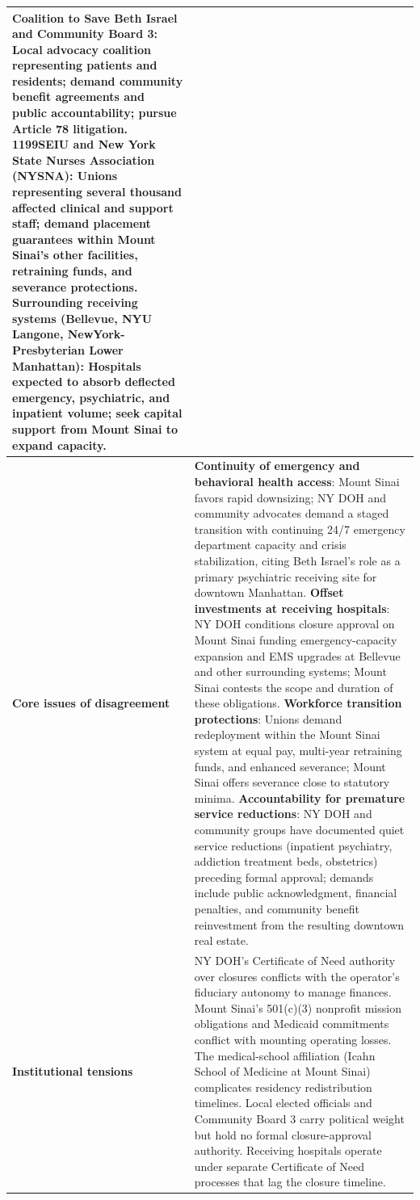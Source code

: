 \documentclass{llmxive}
\begin{document}
\begin{table}[p]
\begin{tabularx}{\textwidth}{@{}l X@{}}
\newline
\textbf{Coalition to Save Beth Israel and Community Board 3}: Local advocacy coalition representing patients and residents; demand community benefit agreements and public accountability; pursue Article 78 litigation.
\newline
\textbf{1199SEIU and New York State Nurses Association (NYSNA)}: Unions representing several thousand affected clinical and support staff; demand placement guarantees within Mount Sinai's other facilities, retraining funds, and severance protections.
\newline
\textbf{Surrounding receiving systems (Bellevue, NYU Langone, NewYork-Presbyterian Lower Manhattan)}: Hospitals expected to absorb deflected emergency, psychiatric, and inpatient volume; seek capital support from Mount Sinai to expand capacity. \\
\midrule
\textbf{Core issues of disagreement} &
\textbf{Continuity of emergency and behavioral health access}: Mount Sinai favors rapid downsizing; NY DOH and community advocates demand a staged transition with continuing 24/7 emergency department capacity and crisis stabilization, citing Beth Israel's role as a primary psychiatric receiving site for downtown Manhattan.
\newline
\textbf{Offset investments at receiving hospitals}: NY DOH conditions closure approval on Mount Sinai funding emergency-capacity expansion and EMS upgrades at Bellevue and other surrounding systems; Mount Sinai contests the scope and duration of these obligations.
\newline
\textbf{Workforce transition protections}: Unions demand redeployment within the Mount Sinai system at equal pay, multi-year retraining funds, and enhanced severance; Mount Sinai offers severance close to statutory minima.
\newline
\textbf{Accountability for premature service reductions}: NY DOH and community groups have documented quiet service reductions (inpatient psychiatry, addiction treatment beds, obstetrics) preceding formal approval; demands include public acknowledgment, financial penalties, and community benefit reinvestment from the resulting downtown real estate. \\
\midrule
\textbf{Institutional tensions} &
NY DOH's Certificate of Need authority over closures conflicts with the operator's fiduciary autonomy to manage finances. Mount Sinai's 501(c)(3) nonprofit mission obligations and Medicaid commitments conflict with mounting operating losses. The medical-school affiliation (Icahn School of Medicine at Mount Sinai) complicates residency redistribution timelines. Local elected officials and Community Board 3 carry political weight but hold no formal closure-approval authority. Receiving hospitals operate under separate Certificate of Need processes that lag the closure timeline. \\

\end{tabularx}
\end{table}
\end{document}
